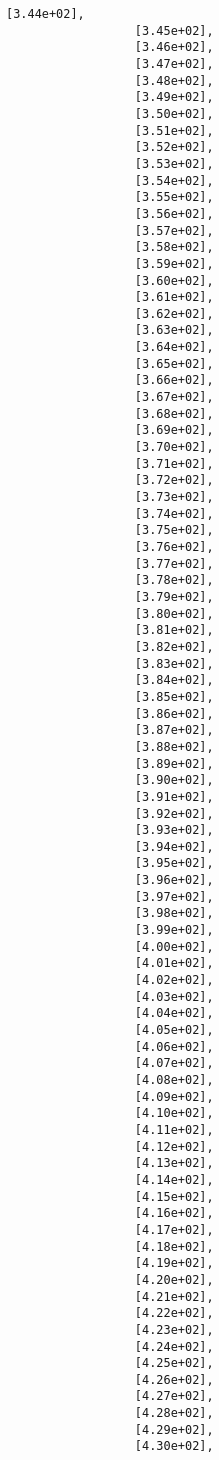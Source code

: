 \documentclass[11pt]{article}
\begin{document}
\begin{Verbatim}[commandchars=\\\{\}]
                  [3.44e+02],
                  [3.45e+02],
                  [3.46e+02],
                  [3.47e+02],
                  [3.48e+02],
                  [3.49e+02],
                  [3.50e+02],
                  [3.51e+02],
                  [3.52e+02],
                  [3.53e+02],
                  [3.54e+02],
                  [3.55e+02],
                  [3.56e+02],
                  [3.57e+02],
                  [3.58e+02],
                  [3.59e+02],
                  [3.60e+02],
                  [3.61e+02],
                  [3.62e+02],
                  [3.63e+02],
                  [3.64e+02],
                  [3.65e+02],
                  [3.66e+02],
                  [3.67e+02],
                  [3.68e+02],
                  [3.69e+02],
                  [3.70e+02],
                  [3.71e+02],
                  [3.72e+02],
                  [3.73e+02],
                  [3.74e+02],
                  [3.75e+02],
                  [3.76e+02],
                  [3.77e+02],
                  [3.78e+02],
                  [3.79e+02],
                  [3.80e+02],
                  [3.81e+02],
                  [3.82e+02],
                  [3.83e+02],
                  [3.84e+02],
                  [3.85e+02],
                  [3.86e+02],
                  [3.87e+02],
                  [3.88e+02],
                  [3.89e+02],
                  [3.90e+02],
                  [3.91e+02],
                  [3.92e+02],
                  [3.93e+02],
                  [3.94e+02],
                  [3.95e+02],
                  [3.96e+02],
                  [3.97e+02],
                  [3.98e+02],
                  [3.99e+02],
                  [4.00e+02],
                  [4.01e+02],
                  [4.02e+02],
                  [4.03e+02],
                  [4.04e+02],
                  [4.05e+02],
                  [4.06e+02],
                  [4.07e+02],
                  [4.08e+02],
                  [4.09e+02],
                  [4.10e+02],
                  [4.11e+02],
                  [4.12e+02],
                  [4.13e+02],
                  [4.14e+02],
                  [4.15e+02],
                  [4.16e+02],
                  [4.17e+02],
                  [4.18e+02],
                  [4.19e+02],
                  [4.20e+02],
                  [4.21e+02],
                  [4.22e+02],
                  [4.23e+02],
                  [4.24e+02],
                  [4.25e+02],
                  [4.26e+02],
                  [4.27e+02],
                  [4.28e+02],
                  [4.29e+02],
                  [4.30e+02],

\end{Verbatim}
\end{document}
